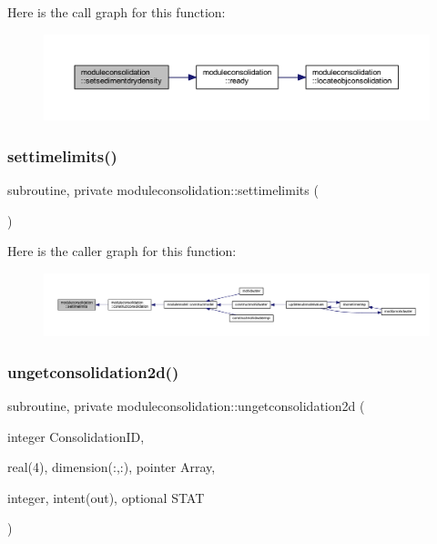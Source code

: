 Here is the call graph for this function\+:\nopagebreak
\begin{figure}[H]
\begin{center}
\leavevmode
\includegraphics[width=350pt]{namespacemoduleconsolidation_a79a5986057fbc83932d56bb8bfcf6b3b_cgraph}
\end{center}
\end{figure}
\mbox{\label{namespacemoduleconsolidation_a8f78f5569405ac5d416a2919286511f3}} 
\subsubsection{\texorpdfstring{settimelimits()}{settimelimits()}}
{\footnotesize\ttfamily subroutine, private moduleconsolidation\+::settimelimits (\begin{DoxyParamCaption}{ }\end{DoxyParamCaption})\hspace{0.3cm}{\ttfamily [private]}}

Here is the caller graph for this function\+:\nopagebreak
\begin{figure}[H]
\begin{center}
\leavevmode
\includegraphics[width=350pt]{namespacemoduleconsolidation_a8f78f5569405ac5d416a2919286511f3_icgraph}
\end{center}
\end{figure}
\mbox{\label{namespacemoduleconsolidation_a9e7318abc8bb17ca00bd720c8eff021f}} 
\subsubsection{\texorpdfstring{ungetconsolidation2d()}{ungetconsolidation2d()}}
{\footnotesize\ttfamily subroutine, private moduleconsolidation\+::ungetconsolidation2d (\begin{DoxyParamCaption}\item[{integer}]{Consolidation\+ID,  }\item[{real(4), dimension(\+:,\+:), pointer}]{Array,  }\item[{integer, intent(out), optional}]{S\+T\+AT }\end{DoxyParamCaption})\hspace{0.3cm}{\ttfamily [private]}}

